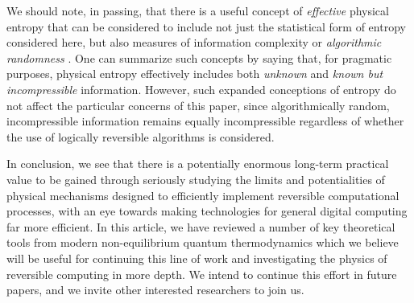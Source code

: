 \documentclass[preprints,article,accept,moreauthors,pdftex]{Definitions/mdpi}
\begin{document}
\begin{paracol}{2}
We should note, in passing, that there is a useful concept of \textit{effective} physical entropy that can be considered to include not just the statistical form of entropy considered here, but also measures of information complexity or \textit{algorithmic randomness} \cite{Zur89}.  One can summarize such concepts by saying that, for pragmatic purposes, physical entropy effectively includes both \textit{unknown} and \textit{known but incompressible} information.  However, such expanded conceptions of entropy do not affect the particular concerns of this paper, since algorithmically random, incompressible information remains equally incompressible regardless of whether the use of logically reversible algorithms is considered.

In conclusion, we see that there is a potentially enormous long-term practical value to be gained through seriously studying the limits and potentialities of physical mechanisms designed to efficiently implement reversible computational processes, with an eye towards making technologies for general digital computing far more efficient. In this article, we have reviewed a number of key theoretical tools from modern non-equilibrium quantum thermodynamics which we believe will be useful for continuing this line of work and investigating the physics of reversible computing in more depth. We intend to continue this effort in future papers, and we invite other interested researchers to join us.




\vspace{6pt} 




\end{paracol}
\end{document}
